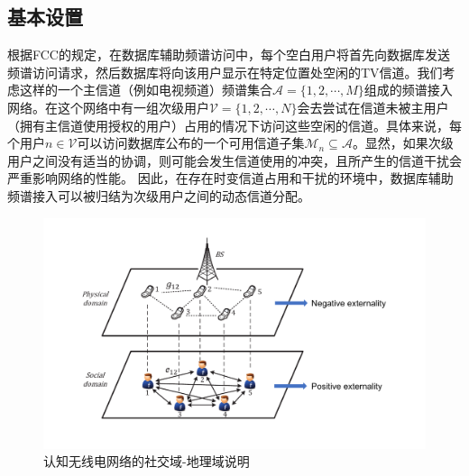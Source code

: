 \subsection{基本设置}\label{sec:system-model}
根据FCC\cite{FCCApril52012}的规定，在数据库辅助频谱访问中，每个空白用户将首先向数据库发送频谱访问请求，然后数据库将向该用户显示在特定位置处空闲的TV信道。我们考虑这样的一个主信道（例如电视频道）频谱集合$\mathcal{A}=\{1,2,\cdots,M\}$组成的频谱接入网络。在这个网络中有一组次级用户$\mathcal{V}=\{1,2,\cdots,N\}$会去尝试在信道未被主用户（拥有主信道使用授权的用户）占用的情况下访问这些空闲的信道。具体来说，每个用户$n\in\mathcal{V}$可以访问数据库公布的一个可用信道子集$\mathcal{M}_n\subseteq\mathcal{A}$。显然，如果次级用户之间没有适当的协调，则可能会发生信道使用的冲突，且所产生的信道干扰会严重影响网络的性能。 {\kaishu 因此，在存在时变信道占用和干扰的环境中，数据库辅助频谱接入可以被归结为次级用户之间的动态信道分配。}
\begin{figure}[!t]
\centering
\includegraphics[scale=0.64]{./pic/sysfig11.pdf}
\caption{认知无线电网络的社交域-地理域说明}\label{fg:domain}
\end{figure}

